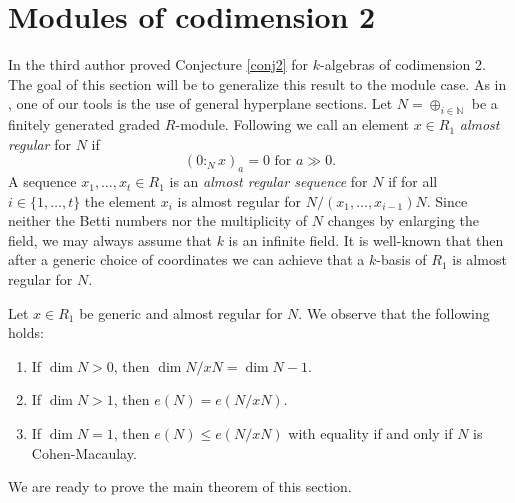 \documentclass[12pt,twoside]{amsart}
\numberwithin{equation}{section}
\newcommand{\N}{\mathbb{N}}
\DeclareMathOperator{\dirsum}{\oplus}
\theoremstyle{definition}
\begin{document}
\section{Modules of codimension 2} \label{sec-mod-2}


In \cite{roemer} the third author proved Conjecture \ref{conj2} for $k$-algebras of
codimension 2. The goal of this section will be to generalize this result to the module
case. As in \cite{roemer}, one of our tools is the use of general hyperplane sections.
Let $N=\dirsum_{i\in \N}$ be a finitely generated graded $R$-module. Following
\cite{ARHE00} we call an element $x \in R_{1}$ {\em almost regular} for $N$ if
$$
(0:_N x)_{a} = 0 \text{ for } a \gg 0.
$$
A sequence $x_1,\ldots,x_t \in R_{1}$ is an {\em almost regular sequence} for $N$ if for
all $i \in \{1,\dots,t\}$ the element $x_i$ is almost regular for
$N/(x_1,\ldots,x_{i-1})N$. Since neither the Betti numbers nor the multiplicity of $N$
changes by enlarging the field, we  may always assume that $k$ is an infinite field. It
is well-known that then after a generic choice of coordinates we can achieve that a
$k$-basis of $R_{1}$ is almost regular for $N$.

Let $x \in R_1$ be generic and almost regular for $N$. We observe that the following
holds:
\begin{enumerate}
\label{almosthelper}
\item
If $\dim N>0$, then $\dim N/xN=\dim N -1$.
\item
If $\dim N>1$, then $e(N) = e(N/xN)$.
\item
If $\dim N = 1$, then $e(N)\leq e(N/xN)$
with equality if and only if $N$ is Cohen-Macaulay.
\end{enumerate}
We are ready to prove the main theorem of this section.
\end{document}

